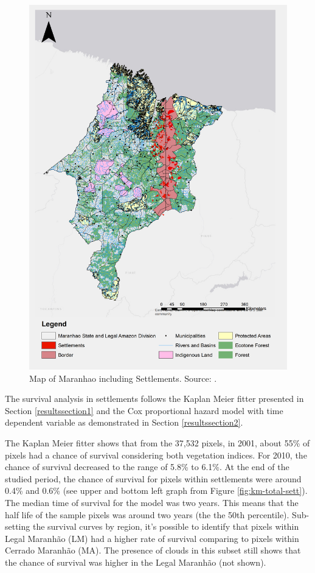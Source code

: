 \begin{figure}[H]
  \centering
  \includegraphics[width=1\textwidth, inner]{Chapter3/MaranhaoChapter3_Fig2.png}
\caption[Map of Maranhao including Settlements]{Map of Maranhao including Settlements. Source: \citep{MMMAwebsite,nugeo_2018}.}
\label{fig:delimitacaosett}
\end{figure}

The survival analysis in settlements follows the  Kaplan Meier fitter presented in Section \ref{resultssection1} and the Cox proportional hazard model with time dependent variable as demonstrated in Section \ref{resultssection2}. 

The Kaplan Meier fitter shows that from the 37,532 pixels, in 2001, about 55\% of pixels had a chance of survival considering both vegetation indices. For 2010, the chance of survival decreased to the range of 5.8\% to 6.1\%. At the end of the studied period, the chance of survival for pixels within settlements were around 0.4\% and 0.6\% (see upper and bottom left graph from Figure \ref{fig:km-total-sett}). The median time of survival for the model was two years. This means that the half life of the sample pixels was around two years (the the 50th percentile). Sub-setting the survival curves by region, it's possible to identify that pixels within Legal Maranhão (LM) had a higher rate of survival comparing to pixels within Cerrado Maranhão (MA). The presence of clouds in this subset still shows that the chance of survival was higher in the Legal Maranhão (not shown). 

